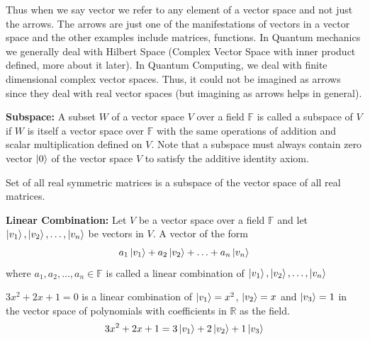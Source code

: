 Thus when we say vector we refer to any element of a vector space and not just the arrows. The arrows are just one of the manifestations of vectors in a vector space and the other
examples include matrices, functions. In Quantum mechanics we generally deal with Hilbert Space (Complex Vector Space with inner product defined, more about it later). 
In Quantum Computing, we deal with finite dimensional complex vector spaces. Thus, it could not be imagined as arrows since they deal with real vector spaces (but imagining as arrows helps in general).

\begin{definition}
    \textbf{Subspace:} A subset $W$ of a vector space $V$ over a field $\mathbb{F}$ is called a subspace of $V$ if $W$ is itself a vector space over $\mathbb{F}$
    with the same operations of addition and scalar multiplication defined on $V$.
    Note that a subspace must always contain zero vector $\ket{0}$ of the vector space $V$ to satisfy the additive identity axiom.
\end{definition}

\begin{example}
    Set of all real symmetric matrices is a subspace of the vector space of all real matrices.
\end{example}

\begin{definition}
    \textbf{Linear Combination:} Let $V$ be a vector space over a field $\mathbb{F}$ and let $\ket{v_1},\ket{v_2},\ldots,\ket{v_n}$ be vectors in $V$. A vector of the form
    \begin{equation}
        a_1\ket{v_1}+a_2\ket{v_2}+\ldots+a_n\ket{v_n}
    \end{equation}
    where $a_1,a_2,\ldots,a_n\in\mathbb{F}$ is called a linear combination of $\ket{v_1},\ket{v_2},\ldots,\ket{v_n}$
\end{definition}

\begin{example}
    $3x^2+2x+1=0$ is a linear combination of $\ket{v_1}=x^2$, $\ket{v_2}=x$ and $\ket{v_3}=1$ in the vector space of polynomials with
    coefficients in $\mathbb{R}$ as the field.
    \[
        3x^2+2x+1=3\ket{v_1}+2\ket{v_2}+1\ket{v_3}
    \]
\end{example}

